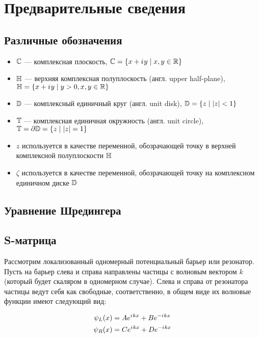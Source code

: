 \chapter{Предварительные сведения}

\section{Различные обозначения}
\begin{itemize}
\item $\mathbb{C}$ — комплексная плоскость, $\mathbb{C} = \{ x + {i\mkern1mu} y \mid x, y \in \mathbb{R} \}$ 
\item $\mathbb{H}$ — верхняя комплексная полуплоскость (англ. upper half-plane), $\mathbb{H} = \{ x + {i\mkern1mu} y \mid y > 0, x, y \in \mathbb{R} \}$
\item $\mathbb{D}$ — комплексный единичный круг (англ. unit disk), $\mathbb{D} = \{ z \mid \abs{z} < 1 \}$
\item $\mathbb{T}$ — комплексная единичная окружность (англ. unit circle), $\mathbb{T} = \partial \mathbb{D} =  \{z \mid \abs{z} = 1 \}$
\item $z$ используется в качестве переменной, обозрачающей точку в верхней комплексной полуплоскости $\mathbb{H}$
\item $\zeta$ используется в качестве переменной, обозрачающей точку на комплексном единичном диске $\mathbb{D}$
\end{itemize}

\section{Уравнение Шредингера}


\section{S-матрица}


Рассмотрим локализованный одномерный потенциальный барьер или резонатор. Пусть на барьер слева и справа направлены частицы с волновым вектором $k$ (который будет скаляром в одномерном случае). Слева и справа от резонатора частицы ведут себя как свободные, соответственно, в общем виде их волновые функции имеют следующий вид:

\begin{equation}
\begin{aligned}
   \psi_L(x) &= A e^{{i\mkern1mu} k x} + B e^{-{i\mkern1mu} k x}
\\ \psi_R(x) &= C e^{{i\mkern1mu} k x} + D e^{-{i\mkern1mu} k x}
\end{aligned}
\end{equation}

